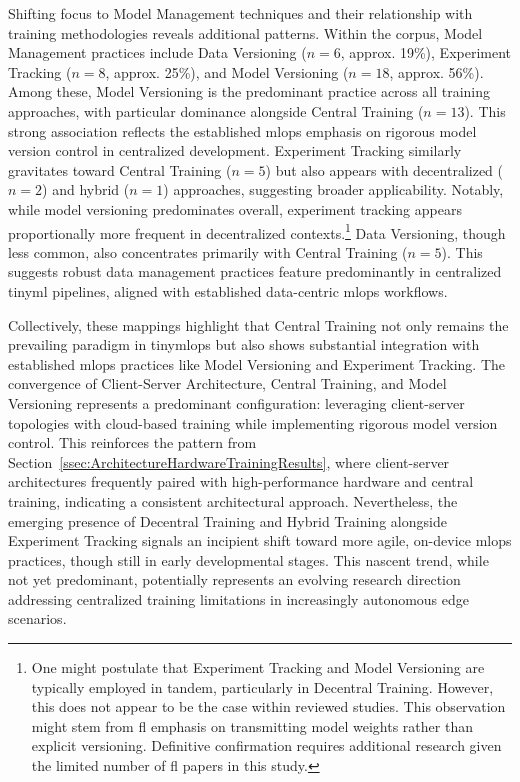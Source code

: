 Shifting focus to Model Management techniques and their relationship with training methodologies reveals additional patterns. Within the corpus, Model Management practices include Data Versioning ($n=6$, approx. 19\%), Experiment Tracking ($n=8$, approx. 25\%), and Model Versioning ($n=18$, approx. 56\%). Among these, Model Versioning is the predominant practice across all training approaches, with particular dominance alongside Central Training ($n=13$). This strong association reflects the established \gls{mlops} emphasis on rigorous model version control in centralized development.
Experiment Tracking similarly gravitates toward Central Training ($n=5$) but also appears with decentralized ($n=2$) and hybrid ($n=1$) approaches, suggesting broader applicability. Notably, while model versioning predominates overall, experiment tracking appears proportionally more frequent in decentralized contexts.\footnote{One might postulate that Experiment Tracking and Model Versioning are typically employed in tandem, particularly in Decentral Training. However, this does not appear to be the case within reviewed studies. This observation might stem from \gls{fl} emphasis on transmitting model weights rather than explicit versioning. Definitive confirmation requires additional research given the limited number of \gls{fl} papers in this study.}
Data Versioning, though less common, also concentrates primarily with Central Training ($n=5$). This suggests robust data management practices feature predominantly in centralized \gls{tinyml} pipelines, aligned with established data-centric \gls{mlops} workflows.

Collectively, these mappings highlight that Central Training not only remains the prevailing paradigm in \gls{tinymlops} but also shows substantial integration with established \gls{mlops} practices like Model Versioning and Experiment Tracking. The convergence of Client-Server Architecture, Central Training, and Model Versioning represents a predominant configuration: leveraging client-server topologies with cloud-based training while implementing rigorous model version control. This reinforces the pattern from Section~\ref{ssec:ArchitectureHardwareTrainingResults}, where client-server architectures frequently paired with high-performance hardware and central training, indicating a consistent architectural approach.
Nevertheless, the emerging presence of Decentral Training and Hybrid Training alongside Experiment Tracking signals an incipient shift toward more agile, on-device \gls{mlops} practices, though still in early developmental stages. This nascent trend, while not yet predominant, potentially represents an evolving research direction addressing centralized training limitations in increasingly autonomous edge scenarios.

